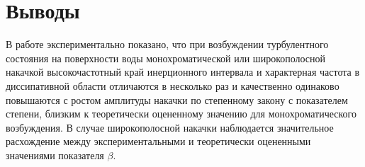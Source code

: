 \section{Выводы} %


В работе экспериментально показано, что при возбуждении турбулентного состояния на поверхности воды монохроматической или широкополосной накачкой высокочастотный край инерционного интервала и характерная частота в диссипативной области отличаются в несколько раз и качественно одинаково повышаются с ростом амплитуды накачки по степенному закону с показателем степени, близким к теоретически оцененному значению для монохроматического возбуждения. В случае широкополосной накачки наблюдается значительное расхождение между экспериментальными и теоретически оцененными значениями показателя $\beta$.

\clearpage

